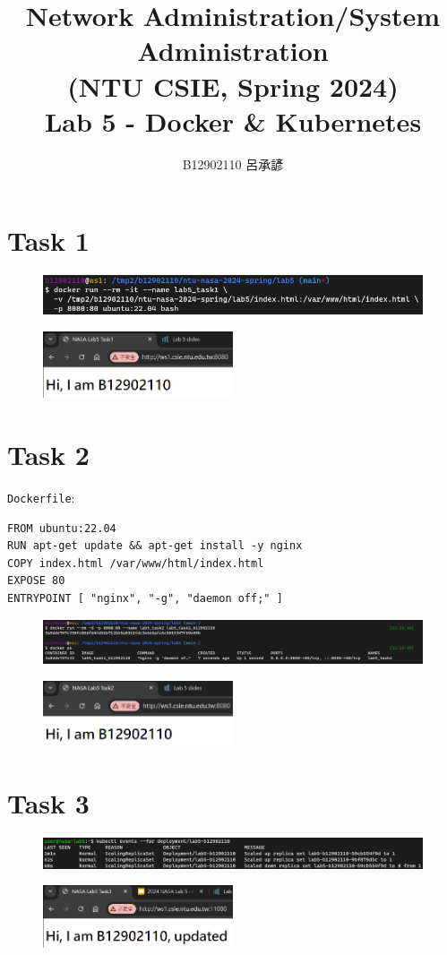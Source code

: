 \documentclass[12pt, a4paper]{article}
\title{
  Network Administration/System Administration\\
  (NTU CSIE, Spring 2024)\\
  Lab 5 - Docker \& Kubernetes
}
\author{\Large B12902110 呂承諺}
\begin{document}
  \maketitle
  \section*{Task 1}
  \begin{figure}[H]
    \centering
    \includegraphics[width=\textwidth]{task1_docker_run.png}
  \end{figure}
  \begin{figure}[H]
    \centering
    \includegraphics[width=0.5\textwidth]{task1_browser.png}
  \end{figure}

  \section*{Task 2}
  \verb|Dockerfile|:
\begin{Verbatim}[frame=single]
FROM ubuntu:22.04
RUN apt-get update && apt-get install -y nginx
COPY index.html /var/www/html/index.html
EXPOSE 80
ENTRYPOINT [ "nginx", "-g", "daemon off;" ]
\end{Verbatim}
  \begin{figure}[H]
   \centering
   \includegraphics[width=\textwidth]{task2_docker.png}
  \end{figure}
  \begin{figure}[H]
   \centering
   \includegraphics[width=0.5\textwidth]{task2_browser.png}
  \end{figure}

  \section*{Task 3}
  \begin{figure}[H]
   \centering
   \includegraphics[width=\textwidth]{task3_kubectl_events.png}
  \end{figure}
  \begin{figure}[H]
   \centering
   \includegraphics[width=0.5\textwidth]{task3_browser.png}
  \end{figure}
\end{document}
